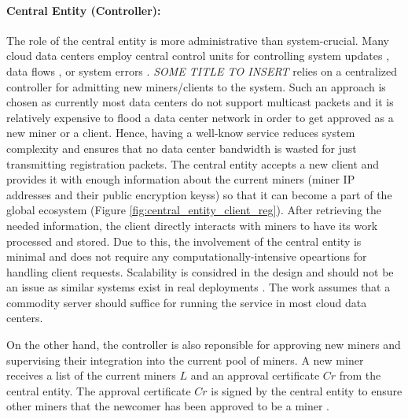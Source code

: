 \documentclass{article}
\newcommand{\projTitle}{SOME TITLE TO INSERT}
\begin{document}
\paragraph{Central Entity (Controller):} The role of the central entity is more administrative than system-crucial. Many cloud data centers employ central control units for controlling system updates \cite{microsoft-autopilot}, data flows \cite{google_jupiter}, or system errors \cite{microsoft_netpoirot}. \textit{\projTitle} relies on a centralized controller for admitting new miners/clients to the system. Such an approach is chosen as currently most data centers do not support multicast packets and it is relatively expensive to flood a data center network in order to get approved as a new miner or a client. Hence, having a well-know service reduces system complexity and ensures that no data center bandwidth is wasted for just transmitting registration packets. The central entity accepts a new client and provides it with enough information about the current miners (miner IP addresses and their public encryption keyss) so that it can become a part of the global ecosystem (Figure \ref{fig:central_entity_client_reg}). After retrieving the needed information, the client directly interacts with miners to have its work processed and stored. Due to this, the involvement of the central entity is minimal and does not require any computationally-intensive opeartions for handling client requests. Scalability is considred in the design and should not be an issue as similar systems exist in real deployments \cite{hadoop_example}. The work assumes that a commodity server should suffice for running the service in most cloud data centers. 
\par


\noindent \newline On the other hand, the controller is also reponsible for approving new miners and supervising their integration into the current pool of miners. A new miner receives a list of the current miners $L$ and an approval certificate $Cr$ from the central entity.
The approval certificate $Cr$ is signed by the central entity to ensure other miners that the newcomer has been approved to be a miner \cite{public-auth-certificate}.
\end{document}

